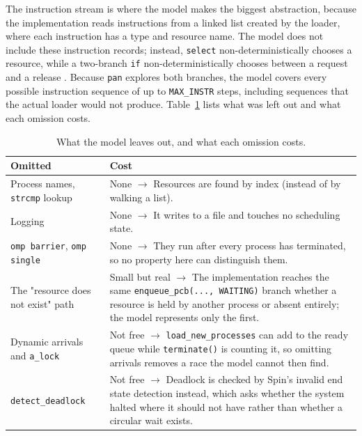 \documentclass[10pt,a4paper]{article}
\newcommand{\code}[1]{\texttt{#1}}
\begin{document}
The instruction stream is where the model makes the biggest abstraction, because
the implementation reads instructions from a linked list created by the loader, 
where each instruction has a type and resource name. The model does not 
include these instruction records; instead, \code{select} non-deterministically 
chooses a resource, while a two-branch \code{if} non-deterministically 
chooses between a request and a release \cite{inggs_promela}. 
Because \code{pan} explores both branches, the model covers every possible 
instruction sequence of up to \code{MAX\_INSTR} steps, including sequences that 
the actual loader would not produce.
Table~\ref{tab:omissions} lists what was left out and what each omission
costs.

\begin{table}[htbp]
\centering
\caption{What the model leaves out, and what each omission costs.}
\label{tab:omissions}
\begin{tabular}{p{4.2cm} p{9.8cm}}
\toprule
\textbf{Omitted} & \textbf{Cost} \\
\midrule
Process names, \code{strcmp} lookup &
None $\rightarrow$ Resources are found by index (instead of by walking a list). \\
\addlinespace
Logging &
None $\rightarrow$ It writes to a file and touches no scheduling state. \\
\addlinespace
\code{omp barrier}, \code{omp single} &
None $\rightarrow$ They run after every process has terminated, so no property here can
distinguish them. \\
\addlinespace
The "resource does not exist" path &
Small but real $\rightarrow$ The implementation reaches the same
\code{enqueue\_pcb(..., WAITING)} branch whether a resource is held by
another process or absent entirely; the model represents only the first. \\
\addlinespace
Dynamic arrivals and \code{a\_lock} &
Not free $\rightarrow$ \code{load\_new\_processes} can add to the ready queue while
\code{terminate()} is counting it, so omitting arrivals removes a race the
model cannot then find. \\
\addlinespace
\code{detect\_deadlock} &
Not free $\rightarrow$ Deadlock is checked by Spin's invalid end state detection instead,
which asks whether the system halted where it should not have rather than
whether a circular wait exists. \\
\bottomrule
\end{tabular}
\end{table}
\end{document}
